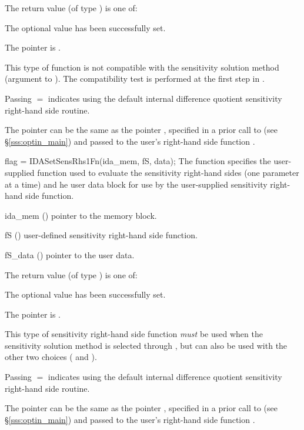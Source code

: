 {
  The return value  (of type ) is one of:
  \begin{args}
  \item[\Id{IDA\_SUCCESS}] 
    The optional value has been successfully set.
  \item[\Id{IDA\_MEM\_NULL}]
    The  pointer is .
  \end{args}
}
{
  {\warn}This type of function is not compatible
  with the  sensitivity solution method (argument 
  to ). The compatibility test is performed at the first
  step in .

  Passing $=$ indicates using the default internal difference 
  quotient sensitivity right-hand side routine.

  The pointer  can be the same as the pointer ,
  specified in a prior call to  (see \S\ref{sss:optin_main})
  and passed to the user's right-hand side function .
}
{
  flag = IDASetSensRhs1Fn(ida\_mem, fS, data);
}
{
  The function  specifies the user-supplied {\C} function
  used to evaluate the sensitivity right-hand sides (one parameter at a time)
  and he user data block for use by the user-supplied sensitivity right-hand 
  side function.
}
{
  \begin{args}
  \item[ida\_mem] ()
    pointer to the {\idas} memory block.
  \item[fS] ()
    user-defined sensitivity right-hand side function.
  \item[fS\_data] ()
    pointer to the user data.
  \end{args}
}
{
  The return value  (of type ) is one of:
  \begin{args}
  \item[\Id{IDA\_SUCCESS}] 
    The optional value has been successfully set.
  \item[\Id{IDA\_MEM\_NULL}]
    The  pointer is .
  \end{args}
}
{
  This type of sensitivity right-hand side function {\em must} be used when
  the  sensitivity solution method is selected through
  , but can also be used with the other two choices
  ( and ).

  Passing $=$ indicates using the default internal difference 
  quotient sensitivity right-hand side routine.

  The pointer  can be the same as the pointer ,
  specified in a prior call to  (see \S\ref{sss:optin_main})
  and passed to the user's right-hand side function .
}
